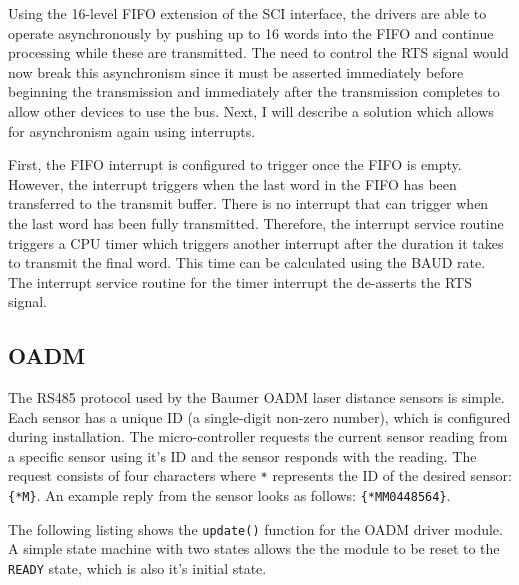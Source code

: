 Using the 16-level FIFO extension of the SCI interface, the drivers are able to operate asynchronously by pushing up to 16 words into the FIFO and continue processing while these are transmitted. The need to control the RTS signal would now break this asynchronism since it must be asserted immediately before beginning the transmission and immediately after the transmission completes to allow other devices to use the bus. Next, I will describe a solution which allows for asynchronism again using interrupts.

First, the FIFO interrupt is configured to trigger once the FIFO is empty. However, the interrupt triggers when the last word in the FIFO has been transferred to the transmit buffer. There is no interrupt that can trigger when the last word has been fully transmitted. Therefore, the interrupt service routine triggers a CPU timer which triggers another interrupt after the duration it takes to transmit the final word. This time can be calculated using the BAUD rate. The interrupt service routine for the timer interrupt the de-asserts the RTS signal.

\subsection{OADM}

The RS485 protocol used by the Baumer OADM laser distance sensors is simple. Each sensor has a unique ID (a single-digit non-zero number), which is configured during installation. The micro-controller requests the current sensor reading from a specific sensor using it's ID and the sensor responds with the reading. The request consists of four characters where \texttt{*} represents the ID of the desired sensor: \texttt{\{*M\}}. An example reply from the sensor looks as follows: \texttt{\{*MM0448564\}}.

The following listing shows the \texttt{update()} function for the OADM driver module. A simple state machine with two states allows the the module to be reset to the \texttt{READY} state, which is also it's initial state.

